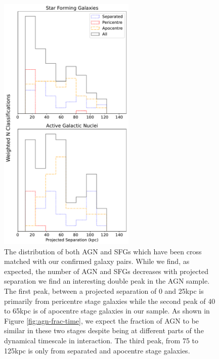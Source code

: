 \begin{figure}
    \centering
    \includegraphics[width=0.58\textwidth]{Chapter3/figures/sfg-agn-dist.pdf}
    \caption[The distribution of both AGN and SFGs which have been cross matched with our confirmed galaxy pairs.]{The distribution of both AGN and SFGs which have been cross matched with our confirmed galaxy pairs. While we find, as expected, the number of AGN and SFGs decreases with projected separation we find an interesting double peak in the AGN sample. The first peak, between a projected separation of 0 and 25kpc is primarily from pericentre stage galaxies while the second peak of 40 to 65kpc is of apocentre stage galaxies in our sample. As shown in Figure \ref{fig:agn-frac-time}, we expect the fraction of AGN to be similar in these two stages despite being at different parts of the dynamical timescale in interaction. The third peak, from 75 to 125kpc is only from separated and apocentre stage galaxies.}
    \label{fig:sfg-agn-proj}
\end{figure}

